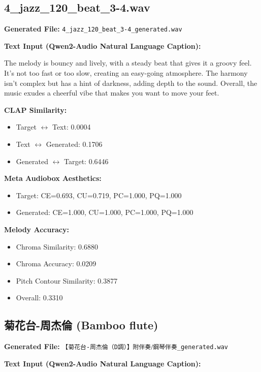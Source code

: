 \documentclass{article}
\begin{document}
\begin{CJK}{UTF8}{bsmi}
\subsection{4\_jazz\_120\_beat\_3-4.wav}

\textbf{Generated File:} \texttt{4\_jazz\_120\_beat\_3-4\_generated.wav}

\textbf{Text Input (Qwen2-Audio Natural Language Caption):}

\small
The melody is bouncy and lively, with a steady beat that gives it a groovy feel. It's not too fast or too slow, creating an easy-going atmosphere. The harmony isn't complex but has a hint of darkness, adding depth to the sound. Overall, the music exudes a cheerful vibe that makes you want to move your feet.
\normalsize

\textbf{CLAP Similarity:}
\begin{itemize}
    \item Target $\leftrightarrow$ Text: 0.0004
    \item Text $\leftrightarrow$ Generated: 0.1706
    \item Generated $\leftrightarrow$ Target: 0.6446
\end{itemize}

\textbf{Meta Audiobox Aesthetics:}
\begin{itemize}
    \item Target: CE=0.693, CU=0.719, PC=1.000, PQ=1.000
    \item Generated: CE=1.000, CU=1.000, PC=1.000, PQ=1.000
\end{itemize}

\textbf{Melody Accuracy:}
\begin{itemize}
    \item Chroma Similarity: 0.6880
    \item Chroma Accuracy: 0.0209
    \item Pitch Contour Similarity: 0.3877
    \item Overall: 0.3310
\end{itemize}

\subsection{菊花台-周杰倫 (Bamboo flute)}

\textbf{Generated File:} \texttt{【菊花台-周杰倫（D調）】附伴奏⧸鋼琴伴奏\_generated.wav}

\textbf{Text Input (Qwen2-Audio Natural Language Caption):}


\end{CJK}
\end{document}
